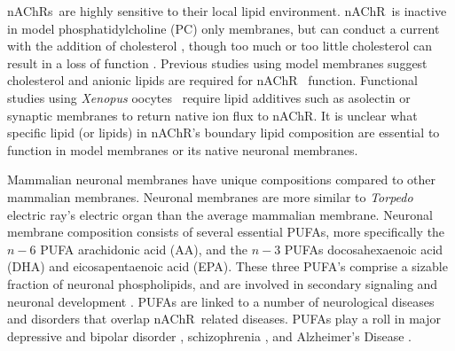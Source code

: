 \documentclass[preprint,3p,9pt,times,onecolumn]{elsarticle}
\newcommand{\liam}[1]{\textcolor{cyan}{#1}}
\newcommand{\nachr}{nAChR}
\newcommand{\plgic}{pLGIC}
\newcommand{\xo}{\textit{Xenopus} oocytes}
\begin{document}
\nachr s~are highly sensitive to their local lipid environment. \nachr~is inactive in model phosphatidylcholine (PC) only membranes, but can conduct a current with the addition of cholesterol \cite{Baenziger2017}, though too much or too little cholesterol can result in a loss of function \cite{M.CriadoH.Eibl1982}.  Previous studies using model membranes suggest cholesterol and anionic lipids \cite{Dalziel1980,Ellena1983,M.CriadoH.Eibl1982,Fong1986,Fong1987,Jones1988,Sunshine1994,DaCosta2009b} are required for \nachr~ function.  Functional studies using \xo~ \cite{Zhou2003,Gamba2005,Chen2015,Kouvatsos2016,Nys2016,Polovinkin2018,Moffett2019,Kumar2020} require lipid additives such as asolectin\cite{M.CriadoH.Eibl1982,Zhou2003,Gamba2005,Chen2015,Kouvatsos2016,Nys2016,Polovinkin2018,Moffett2019,Kumar2020} or synaptic membranes \cite{Conti2013} to return native ion flux to \nachr. It is unclear what specific lipid (or lipids) in \nachr's boundary lipid composition are essential to function in model membranes or its native neuronal membranes.%

Mammalian neuronal membranes \cite{Isolated1969, Taguchi2010, Breckenridge1973,Ingolfsson2017b} have unique compositions compared to other mammalian membranes\cite{McEvoy2000,Kim2001,VanMeer2010,Lorent2020,Ingolfsson2014}. Neuronal membranes are more similar to \textit{Torpedo} electric ray's electric organ \cite{Barrantes1989,Quesada2016} than the average mammalian membrane\cite{Ingolfsson2014}. Neuronal membrane \cite{Isolated1969, Taguchi2010, Breckenridge1973,Ingolfsson2017b} composition consists of several essential PUFAs, more specifically the $n-6$ PUFA arachidonic acid (AA), and the $n-3$ PUFAs docosahexaenoic acid (DHA) and eicosapentaenoic acid (EPA). These three PUFA's comprise a sizable fraction of neuronal phospholipids, and are involved in secondary signaling \cite{McNamara2008,Hamazaki2015} and neuronal development \cite{Maekawa2017}. PUFAs are linked to a number of neurological diseases and disorders that overlap \nachr~related diseases. PUFAs play a roll in major depressive and bipolar disorder \cite{MuralikrishnaAdibhatla,McNamara2008,Schneider2017,Koga2019,Hamazaki2015}, schizophrenia \cite{Peet2003,Bushe2005,Berger2006,Schneider2017,Maekawa2017,Hamazaki2015}, and Alzheimer's Disease \cite{Conquer2000,DiPaolo2011,Bennett2013,MuralikrishnaAdibhatla,Yadav2014a,Escriba2017}. %
\end{document}
